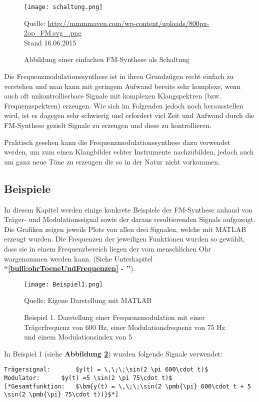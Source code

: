 \begin{figure} [ht]
\centering
  \texttt{[image: schaltung.png]}
\caption{Abbildung einer einfachen FM-Synthese als Schaltung}
\label{fig:schaltung}
Quelle: \url{http://mmmmaven.com/wp-content/uploads/800px-2op_FM.svg_.png} 
\\Stand 16.06.2015
\end{figure}

Die Frequenzmodulationssynthese ist in ihren Grundzügen recht einfach zu verstehen und man kann mit geringem Aufwand bereits sehr komplexe, wenn auch oft unkontrollierbare Signale mit komplexen Klangspektren (bzw. Frequenzspektren) erzeugen. Wie sich im Folgenden jedoch noch herausstellen wird, ist es dagegen sehr schwierig und erfordert viel Zeit und Aufwand durch die FM-Synthese gezielt Signale zu erzeugen und diese zu kontrollieren.

Praktisch gesehen kann die Frequenzmodulationssynthese dazu verwendet werden, um zum einen Klangbilder echter Instrumente nachzubilden, jedoch auch um ganz neue Töne zu erzeugen die so in der Natur nicht vorkommen.

\FloatBarrier
\subsection{Beispiele}
In diesem Kapitel werden einige konkrete Beispiele der FM-Synthese anhand von Träger- und Modulationssignal sowie der daraus resultierenden Signals aufgezeigt. Die Grafiken zeigen jeweils Plots von allen drei Signalen, welche mit MATLAB erzeugt wurden.
Die Frequenzen der jeweiligen Funktionen wurden so gewählt, dass sie in einem Frequenzbereich liegen der vom menschlichen Ohr wargenommen werden kann. (Siehe Unterkapitel \textbf{``\ref{bulli:ohrToeneUndFrequenzen} - ''}).

\begin{figure} [ht]
\centering
  \texttt{[image: Beispiel1.png]}
\caption{Beispiel 1. Darstellung einer Frequenzmodulation mit einer Trägerfrequenz von 600 Hz, einer Modulationsfrequenz von 75 Hz und einem Modulationsindex von 5 }
\label{fig:beispiel1}
Quelle: Eigene Darstellung mit MATLAB
\end{figure}

In Beispiel 1 (siehe \textbf{Abbildung \ref{fig:beispiel1}})  wurden folgende Signale verwendet:

\begin{lstlisting}[mathescape]
Trägersignal: 		$y(t) = \,\;\;\sin(2 \pi 600\cdot t)$
Modulator:		$y(t) =5 \sin(2 \pi 75\cdot t)$
[*Gesamtfunktion: 	$\bm{y(t) = \,\;\;\sin(2 \pmb{\pi} 600\cdot t + 5 \sin(2 \pmb{\pi} 75\cdot t))}$*]
\end{lstlisting}

